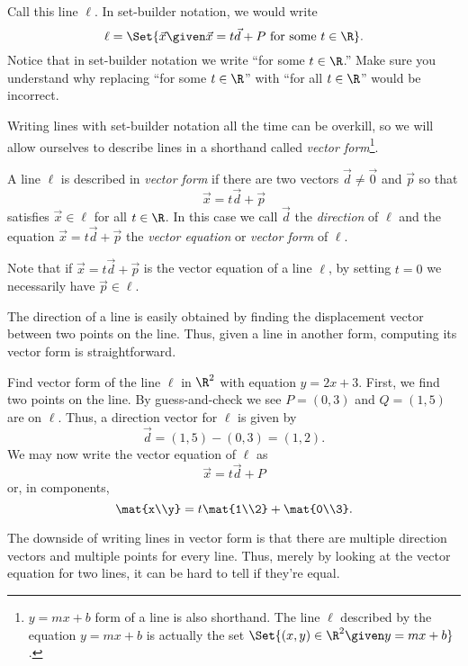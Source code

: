 Call this line $\ell$.  In set-builder notation, we would write
\[
	\ell=\Set{\vec x\given \vec x=t\vec d+P\text{ for some }t\in \R}.
\]
Notice that in set-builder notation we write ``for some $t\in \R$.'' Make sure you
understand why replacing ``for some $t\in\R$'' with ``for
all $t\in \R$'' would be incorrect.  

Writing lines with set-builder notation all the time can be overkill, 
so we will allow ourselves to describe lines in a shorthand called \emph{vector form}\footnote{
	$y=mx+b$ form of a line is also shorthand.  The line $\ell$ described by the equation
	$y=mx+b$ is actually the set $\Set{(x,y)\in\R^2\given y=mx+b}$.
}.  

\begin{definition}
	A line $\ell$ is described in \emph{vector form} if
	there are two vectors $\vec d\neq \vec 0$ and $\vec p$ so that
	\[
		\vec x=t\vec d+\vec p
	\]
	satisfies $\vec x\in \ell$ for all $t\in \R$.  In this case we call $\vec d$ the
	\emph{direction} of $\ell$ and the equation $\vec x=t\vec d+\vec p$ the 
	\emph{vector equation} or \emph{vector form}
	of $\ell$.
\end{definition}

Note that if $\vec x=t\vec d+\vec p$ is the vector equation of a line $\ell$, by setting $t=0$
we necessarily have $\vec p\in\ell$.  

The direction of a line is easily obtained by finding the displacement vector between two points
on the line.  Thus, given a line in another form, computing its vector form is straightforward.
\begin{example}
	Find vector form of the line $\ell$ in $\R^2$ with equation $y=2x+3$.  First, we find two
	points on the line.  By guess-and-check we see $P=(0,3)$ and $Q=(1,5)$ are on $\ell$.
	Thus, a direction vector for $\ell$ is given by 
	\[
		\vec d = (1,5)-(0,3)=(1,2).
	\]
	We may now write the vector equation of $\ell$ as 
	\[
		\vec x=t\vec d+P
	\]
	or, in components,
	\[
		\mat{x\\y} = t\mat{1\\2}+\mat{0\\3}.
	\]
\end{example}

The downside of writing lines in vector form is that there are multiple direction vectors and multiple points
for every line.  Thus, merely by looking at the vector equation for two lines, it can be hard to tell if
they're equal.

